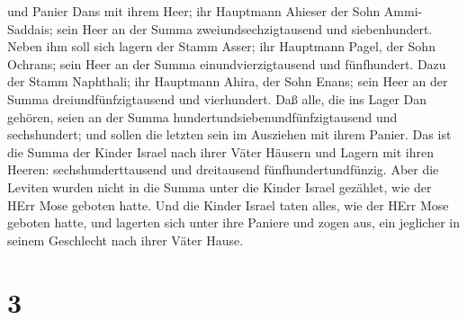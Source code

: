 und Panier Dans mit ihrem Heer; ihr Hauptmann Ahieser der Sohn
Ammi-Saddais;  sein Heer an der Summa zweiundsechzigtausend
und siebenhundert.  Neben ihm soll sich lagern der Stamm
Asser; ihr Hauptmann Pagel, der Sohn Ochrans;  sein Heer an
der Summa einundvierzigtausend und fünfhundert.  Dazu der
Stamm Naphthali; ihr Hauptmann Ahira, der Sohn Enans;  sein
Heer an der Summa dreiundfünfzigtausend und vierhundert. 
Daß alle, die ins Lager Dan gehören, seien an der Summa
hundertundsiebenundfünfzigtausend und sechshundert; und sollen die
letzten sein im Ausziehen mit ihrem Panier.  Das ist die
Summa der Kinder Israel nach ihrer Väter Häusern und Lagern mit ihren
Heeren: sechshunderttausend und dreitausend fünfhundertundfünzig.
 Aber die Leviten wurden nicht in die Summa unter die
Kinder Israel gezählet, wie der HErr Mose geboten hatte. 
Und die Kinder Israel taten alles, wie der HErr Mose geboten hatte, und
lagerten sich unter ihre Paniere und zogen aus, ein jeglicher in seinem
Geschlecht nach ihrer Väter Hause.

\hypertarget{section-2}{%
\section{3}\label{section-2}}

